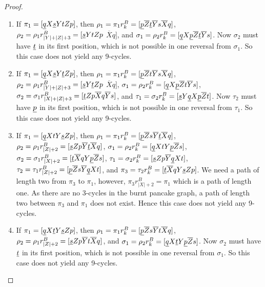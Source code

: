 \documentclass[final]{dmtcs-episciences}
\numberwithin{equation}{section}
\begin{document}
\begin{proof}
\begin{enumerate}
\begin{enumerate}
    \begin{enumerate}
        \item If $\pi_{1}=[\uline{q} X \uline{s} Y t Z p]$, then $\rho_{1}=\pi_{1}r^B_k=[\uline{p} \overline{Z} \uline{t} \overline{Y} s \overline{X} q]$, $\rho_{2}=\rho_{1}r^B_{|Y|+|Z|+3}=[\uline{s} Y t Z p$ $\overline{X} q]$, and $\sigma_{1}=\rho_{2}r^B_k=[\uline{q} X \uline{p} \overline{Z} \uline{t} \overline{Y} s]$. Now $\sigma_{2}$ must have $\uline{t}$ in its first position, which is not possible in one reversal from $\sigma_{1}$. So this case does not yield any 9-cycles.
        
        \item If $\pi_{1}=[\uline{q} X \uline{s} Y \uline{t} Z p]$, then $\rho_{1}=\pi_{1}r^B_k=[\uline{p} \overline{Z} t \overline{Y} s \overline{X} q]$, $\rho_{2}=\rho_{1}r^B_{|Y|+|Z|+3}=[\uline{s} Y \uline{t} Z p$ $\overline{X} q]$, $\sigma_{1}=\rho_{2}r^B_k=[\uline{q} X \uline{p} \overline{Z} t \overline{Y} s]$, $\sigma_{2}=\sigma_{1}r^B_{|X|+|Z|+3}=[\uline{t} Z p \overline{X} q \overline{Y} s]$, and $\tau_{1}=\sigma_{2}r^B_k=[\uline{s} Y  \uline{q} X \uline{p} \overline{Z} t]$. Now $\tau_{2}$ must have $\uline{p}$ in its first position, which is not possible in one reversal from $\tau_{1}$. So this case does not yield any 9-cycles.
        
        
        \item If $\pi_{1}=[\uline{q} X t Y \uline{s} Z p]$, then $\rho_{1}=\pi_{1}r^B_k=[\uline{p} \overline{Z} s \overline{Y} \uline{t} \overline{X} q]$, $\rho_{2}=\rho_{1}r^B_{|Z|+2}=[\uline{s} Z p \overline{Y} \uline{t} \overline{X} q]$, $\sigma_{1}=\rho_{2}r^B_k=[\uline{q} X t Y \uline{p} \overline{Z} s]$, $\sigma_{2}=\sigma_{1}r^B_{|X|+2}=[\uline{t} \overline{X} q Y \uline{p} \overline{Z} s]$, $\tau_{1}=\sigma_{2}r^B_k=[\uline{s} Z p \overline{Y} \uline{q} X t]$, $\tau_{2}=\tau_{1}r^B_{|Z|+2}=[\uline{p} \overline{Z} s \overline{Y} \uline{q} X t]$, and $\pi_{3}=\tau_{2}r^B_k=[\uline{t} \overline{X} q Y \uline{s} Z p]$. We need a path of length two from $\pi_{3}$ to $\pi_{1}$, however, $\pi_{3}r^B_{|X|+2}=\pi_{1}$ which is a path of length one. As there are no 3-cycles in the burnt pancake graph, a path of length two between $\pi_{3}$ and $\pi_{1}$ does not exist. Hence this case does not yield any 9-cycles.
        
        \item If $\pi_{1}=[\uline{q} X \uline{t} Y \uline{s} Z p]$, then $\rho_{1}=\pi_{1}r^B_k=[\uline{p} \overline{Z} s \overline{Y} t \overline{X} q]$, $\rho_{2}=\rho_{1}r^B_{|Z|+2}=[\uline{s} Z p \overline{Y} t \overline{X} q]$, and $\sigma_{1}=\rho_{2}r^B_k=[\uline{q} X \uline{t} Y \uline{p} \overline{Z} s]$. Now $\sigma_{2}$ must have $\uline{t}$ in its first position, which is not possible in one reversal from $\sigma_{1}$. So this case does not yield any 9-cycles.
    \end{enumerate}
    

\end{enumerate}
\end{enumerate}
\end{proof}
\end{document}

